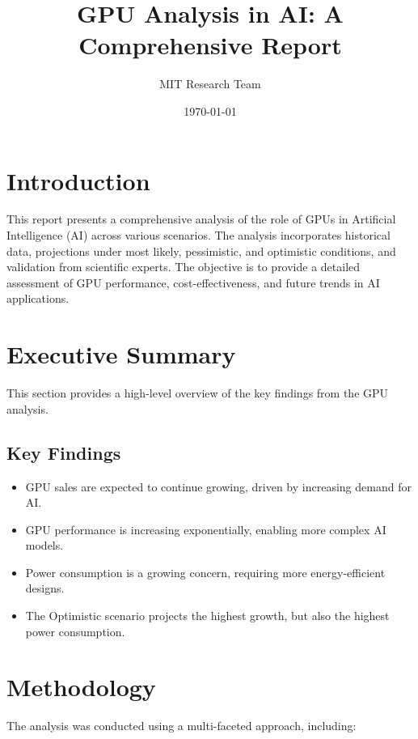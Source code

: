 \documentclass{article}
\title{GPU Analysis in AI: A Comprehensive Report}
\author{MIT Research Team}
\date{\today}
\begin{document}
\maketitle
\thispagestyle{empty} %
\newpage

\tableofcontents
\newpage

\section{Introduction}

This report presents a comprehensive analysis of the role of GPUs in Artificial Intelligence (AI) across various scenarios. The analysis incorporates historical data, projections under most likely, pessimistic, and optimistic conditions, and validation from scientific experts. The objective is to provide a detailed assessment of GPU performance, cost-effectiveness, and future trends in AI applications.

\section{Executive Summary}

This section provides a high-level overview of the key findings from the GPU analysis.

\subsection{Key Findings}

\begin{itemize}
    \item GPU sales are expected to continue growing, driven by increasing demand for AI.
    \item GPU performance is increasing exponentially, enabling more complex AI models.
    \item Power consumption is a growing concern, requiring more energy-efficient designs.
    \item The Optimistic scenario projects the highest growth, but also the highest power consumption.
\end{itemize}

\section{Methodology}

The analysis was conducted using a multi-faceted approach, including:
\end{document}
